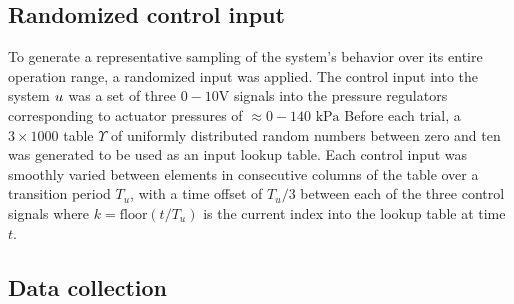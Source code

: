 \subsection{Randomized control input}

To generate a representative sampling of the system's behavior over its entire operation range, a randomized input was applied.
The control input into the system $u$ was a set of three $0-10 \text{V}$ signals into the pressure regulators corresponding to actuator pressures of $\approx 0-140 \text{ kPa}$
Before each trial, a $3 \times 1000$ table $\Upsilon$ of uniformly distributed random numbers between zero and ten was generated to be used as an input lookup table.
Each control input was smoothly varied between elements in consecutive columns of the table over a transition period $T_u$, with a time offset of $T_u / 3$ between each of the three control signals
where $k = \text{floor}\left( {t} / {T_u} \right)$ is the current index into the lookup table at time $t$. 



\subsection{Data collection}


